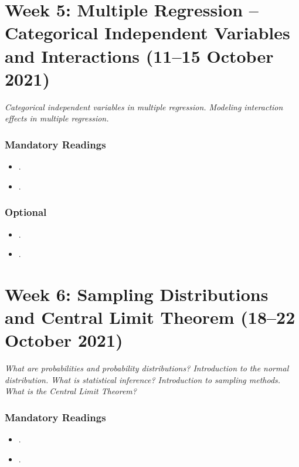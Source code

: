 \documentclass[abstract=on,parskip=full,headings=standardclasses,fontsize=11pt,paper=a4]{scrartcl}
\begin{document}
\section{Week 5: Multiple Regression -- Categorical Independent Variables and Interactions (11--15 October 2021)}


\textit{Categorical independent variables in multiple regression. Modeling interaction effects in multiple regression.}

\subsubsection*{Mandatory Readings}
\begin{itemize}
\item {}.
\item {}.
\end{itemize}


\subsubsection*{Optional}
\begin{itemize}
\item {}.
\item {}.
\end{itemize}




\section{Week 6:  Sampling Distributions and Central Limit Theorem (18--22 October 2021)}


\textit{What are probabilities and probability distributions? Introduction to the normal distribution. What is statistical inference? Introduction to sampling methods. What is the Central Limit Theorem?}


\subsubsection*{Mandatory Readings}
\begin{itemize}
\item {}.
\item {}.
\end{itemize}
\end{document}
